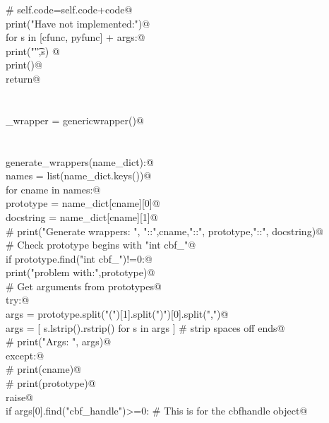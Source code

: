 \documentclass[10pt,a4paper,twoside,notitlepage]{article}
\begin{document}
\begin{flushleft}
\begin{list}{}{}
\mbox{}\verb@#       self.code=self.code+code@\\
\mbox{}\verb@       print("Have not implemented:")@\\
\mbox{}\verb@       for s in [cfunc, pyfunc] + args:@\\
\mbox{}\verb@           print("\t",s) @\\
\mbox{}\verb@       print()@\\
\mbox{}\verb@       return@\\
\mbox{}\verb@@\\
\mbox{}\verb@@\\
\mbox{}\verb@generic_wrapper = genericwrapper()@\\
\mbox{}\verb@@\\
\mbox{}\verb@@\\
\mbox{}\verb@def generate_wrappers(name_dict):@\\
\mbox{}\verb@   names = list(name_dict.keys())@\\
\mbox{}\verb@   for cname in names:@\\
\mbox{}\verb@      prototype = name_dict[cname][0]@\\
\mbox{}\verb@      docstring = name_dict[cname][1]@\\
\mbox{}\verb@      # print("Generate wrappers: ", "::",cname,"::", prototype,"::", docstring)@\\
\mbox{}\verb@      # Check prototype begins with "int cbf_"@\\
\mbox{}\verb@      if prototype.find("int cbf_")!=0:@\\
\mbox{}\verb@         print("problem with:",prototype)@\\
\mbox{}\verb@      # Get arguments from prototypes@\\
\mbox{}\verb@      try:@\\
\mbox{}\verb@         args = prototype.split("(")[1].split(")")[0].split(",")@\\
\mbox{}\verb@         args = [ s.lstrip().rstrip() for s in args ] # strip spaces off ends@\\
\mbox{}\verb@         # print("Args: ", args)@\\
\mbox{}\verb@      except:@\\
\mbox{}\verb@         # print(cname)@\\
\mbox{}\verb@         # print(prototype)@\\
\mbox{}\verb@         raise@\\
\mbox{}\verb@      if args[0].find("cbf_handle")>=0: # This is for the cbfhandle object@\\

\end{list}
\end{flushleft}
\end{document}
